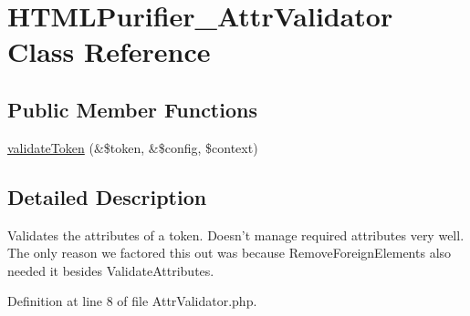 \hypertarget{classHTMLPurifier__AttrValidator}{\section{H\+T\+M\+L\+Purifier\+\_\+\+Attr\+Validator Class Reference}
\label{classHTMLPurifier__AttrValidator}
}
\subsection*{Public Member Functions}
\begin{DoxyCompactItemize}
\item 
\hyperlink{classHTMLPurifier__AttrValidator_a5c322fe3098752902648b4afd3344b92}{validate\+Token} (\&\$token, \&\$config, \$context)
\end{DoxyCompactItemize}


\subsection{Detailed Description}
Validates the attributes of a token. Doesn't manage required attributes very well. The only reason we factored this out was because Remove\+Foreign\+Elements also needed it besides Validate\+Attributes. 

Definition at line 8 of file Attr\+Validator.\+php.



